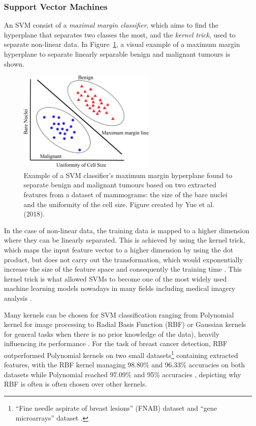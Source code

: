 \subsubsection{Support Vector Machines}
\label{sec:litsurvey-svms}

An SVM consist of a \textit{maximal margin classifier}, which aims to find the hyperplane that separates two classes the most, and the \textit{kernel trick}, used to separate non-linear data. In Figure~\ref{fig:litsurvey-svm-example}, a visual example of a maximum margin hyperplane to separate linearly separable benign and malignant tumours is shown.\\

\begin{figure}[ht]
\centerline{\includegraphics[width=0.6\textwidth]{figures/litsurvey/svm.png}}
\caption{\label{fig:litsurvey-svm-example}Example of a SVM classifier's maximum margin hyperplane found to separate benign and malignant tumours based on two extracted features from a dataset of mammograms: the size of the bare nuclei and the uniformity of the cell size. Figure created by Yue et al. (2018).}
\end{figure}

In the case of non-linear data, the training data is mapped to a higher dimension where they can be linearly separated. This is achieved by using the kernel trick, which maps the input feature vector to a higher dimension by using the dot product, but does not carry out the transformation, which would exponentially increase the size of the feature space and consequently the training time \citep{Geron2019}. This kernel trick is what allowed SVMs to become one of the most widely used machine learning models nowadays in many fields including medical imagery analysis \citep{Yue2018}.

Many kernels can be chosen for SVM classification ranging from Polynomial kernel for image processing to Radial Basis Function (RBF) or Gaussian kernels for general tasks when there is no prior knowledge of the data), heavily influencing its performance \citep{amari1999improving}. For the task of breast cancer detection, RBF outperformed Polynomial kernels on two small datasets\footnote{``Fine needle aspirate of breast lesions'' (FNAB) dataset and ``gene microarrays'' dataset \citep{Osareh2010}.} containing extracted features, with the RBF kernel managing 98.80\% and 96.33\% accuracies on both datasets while Polynomial reached 97.09\% and 95\% accuracies \citep{Osareh2010}, depicting why RBF is often is often chosen over other kernels.\\

